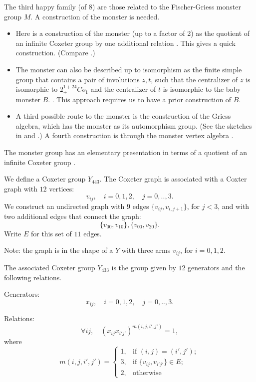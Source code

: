 The third happy family (of 8) are those related to the Fischer-Griess
monster group $M$.  A construction of the monster is needed.

\begin{itemize}
 \item
 Here is a construction of the monster (up to a factor of
 2) as the quotient of an infinite Coxeter group by one
 additional relation \cite{P}.  This gives a quick
 construction. (Compare \cite[sec.5.8.5]{wilson2009finite}.)
\item The monster can also be described up to isomorphism as the
  finite simple group that contains a pair of involutions $z,t$, such
  that the centralizer of $z$ is isomorphic to $2^{1+24}_{+}Co_1$ and
  the centralizer of $t$ is isomorphic to the baby monster
  $B$. \cite[p.148]{robert1998twelve}.  This approach requires us to
  have a prior construction of $B$.
\item A third possible route to the monster is the construction of the
  Griess algebra, which has the monster as its automorphism group.
  (See the sketches in \cite[p.146]{robert1998twelve} and
  \cite[p.251]{wilson2009finite}.)  A fourth construction is through
  the monster vertex algebra \cite{VOA}.
\end{itemize}

The monster group has an elementary presentation in terms of a
quotient of an infinite Coxeter group \cite{JNB} \cite{P}.

We define a Coxeter group $Y_{443}$.  The Coxeter graph is associated
with a Coxter graph with $12$ vertices:
\[
v_{ij},\quad i=0,1,2,\quad j=0,..,3.
\]
We construct an undirected graph with $9$ edges
$\{v_{ij},v_{i,{j+1}}\}$, for $j<3$, and with two additional edges
that connect the graph:
\[
\{v_{00},v_{10}\}, \{v_{00},v_{20}\}.
\]
Write $E$ for this set of $11$ edges.

Note: the graph is in the shape of a $Y$ with three arms $v_{ij}$, for
$i=0,1,2$.

The associated Coxeter group $Y_{433}$ is the group given by $12$
generators and the following relations.

Generators:
\[
x_{ij}, \quad i=0,1,2,\quad j=0,..,3.
\]

Relations:
\[
\forall i j, \quad (x_{ij}x_{i'j'})^{m(i,j,i',j')} = 1,
\]
where
\[
m(i,j,i',j') = 
\begin{cases}
1,&\text{if } (i,j) = (i',j');\\
3,&\text{if }  \{v_{ij},v_{i'j'}\}\in E;\\
2,&\text{otherwise}
\end{cases}
\]

